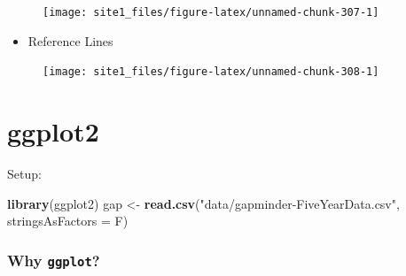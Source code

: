 \documentclass[]{book}
\newenvironment{Shaded}{\begin{snugshade}}{\end{snugshade}}
\newcommand{\KeywordTok}[1]{\textcolor[rgb]{0.13,0.29,0.53}{\textbf{#1}}}
\newcommand{\DataTypeTok}[1]{\textcolor[rgb]{0.13,0.29,0.53}{#1}}
\newcommand{\DecValTok}[1]{\textcolor[rgb]{0.00,0.00,0.81}{#1}}
\newcommand{\StringTok}[1]{\textcolor[rgb]{0.31,0.60,0.02}{#1}}
\newcommand{\CommentTok}[1]{\textcolor[rgb]{0.56,0.35,0.01}{\textit{#1}}}
\newcommand{\OperatorTok}[1]{\textcolor[rgb]{0.81,0.36,0.00}{\textbf{#1}}}
\newcommand{\NormalTok}[1]{#1}
\providecommand{\tightlist}{%
  \setlength{\itemsep}{0pt}\setlength{\parskip}{0pt}}
\begin{document}
\begin{figure}

{\centering \texttt{[image: site1\_files/figure-latex/unnamed-chunk-307-1]} 

}

\caption{ }\label{fig:unnamed-chunk-307}
\end{figure}

\begin{itemize}
\tightlist
\item
  Reference Lines
\end{itemize}

\begin{Shaded}
\end{Shaded}

\begin{figure}

{\centering \texttt{[image: site1\_files/figure-latex/unnamed-chunk-308-1]} 

}

\caption{ }\label{fig:unnamed-chunk-308}
\end{figure}

\section{ggplot2}\label{ggplot2}

Setup:

\begin{Shaded}
\begin{Highlighting}[]
\KeywordTok{library}\NormalTok{(ggplot2)}
\NormalTok{gap <-}\StringTok{ }\KeywordTok{read.csv}\NormalTok{(}\StringTok{"data/gapminder-FiveYearData.csv"}\NormalTok{, }\DataTypeTok{stringsAsFactors =}\NormalTok{ F)}
\end{Highlighting}
\end{Shaded}

\subsubsection*{\texorpdfstring{Why
\texttt{ggplot}?}{Why ggplot?}}\label{why-ggplot}
\end{document}
